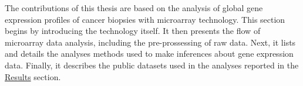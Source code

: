The contributions of this thesis are based on the analysis of global gene
expression profiles of cancer biopsies with microarray technology.  This section
begins by introducing the technology itself.  It then presents the flow of
microarray data analysis, including the pre-prossessing of raw data.  Next, it
lists and details the analyses methods used to make inferences about gene
expression data. Finally, it describes the public datasets used in the analyses
reported in the \hyperref[chap:results]{\textsf{Results}} section.




